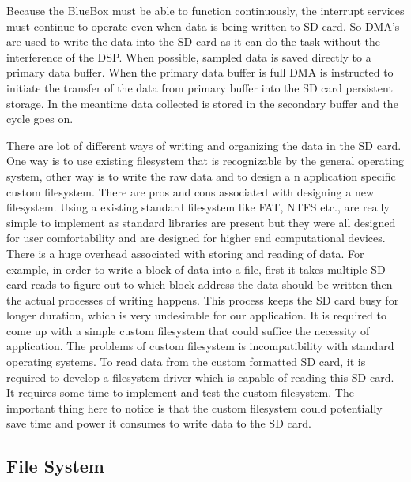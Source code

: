 Because the BlueBox must be able to function continuously, the interrupt services must continue to operate even when data is being written to SD card. So DMA's are used to write the data into the SD card as it can do the task without the interference of the DSP. When possible, sampled data is saved directly to a primary data buffer. When the primary data buffer is full DMA is instructed to initiate the transfer of the data from primary buffer into the SD card persistent storage. In the meantime data collected is stored in the secondary buffer and the cycle goes on. 

 There are lot of different ways of writing and organizing the data in the SD card. One way is to use existing filesystem that is recognizable by the general operating system, other way is to write the raw data and to design a n application specific custom filesystem. There are pros and cons associated with designing a new filesystem. Using a existing standard filesystem like FAT, NTFS etc., are really simple to implement as standard libraries are present but they were all designed for user comfortability and are designed for higher end computational devices. There is a huge overhead associated with storing and reading of data. For example, in order to write a block of data into a file, first it takes multiple SD card reads to figure out to which block address the data should be written then the actual processes of writing happens. This process keeps the SD card busy for longer duration, which is very undesirable for our application. It is required to come up with a simple custom filesystem that could suffice the necessity of application. The problems of custom filesystem is incompatibility with standard operating systems. To read data from the custom formatted SD card, it is required to develop a filesystem driver which is capable of reading this SD card. It requires some time to implement and test the custom filesystem. The important thing here to notice is that the custom filesystem could potentially save time and power it consumes to write data to the SD card.


\subsection{File System}\label{filesystem} 

